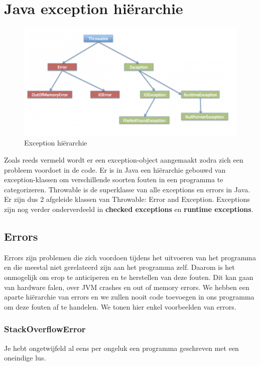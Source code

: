 \section{Java exception hi\"erarchie}
  
\begin{figure}[H]
\includegraphics[width=\linewidth]{images/h1/exception-hierarchy.png}
\caption{Exception hi\"erarchie}
\label{fig:exceptiono_hierarchy}
\end{figure}
  
Zoals reeds vermeld wordt er een exception-object aangemaakt zodra zich een probleem voordoet in de code. 
Er is in Java een hi\"erarchie gebouwd van exception-klassen om verschillende soorten fouten in een programma te categorizeren. Throwable is de superklasse van alle exceptions en errors in Java. Er zijn dus 2 afgeleide klassen van Throwable: Error and Exception. Exceptions zijn nog verder onderverdeeld in \textbf{checked exceptions} en \textbf{runtime exceptions}.

\subsection{Errors}

Errors zijn problemen die zich voordoen tijdens het uitvoeren van het programma en die meestal niet gerelateerd zijn aan het programma zelf. Daarom is het onmogelijk om erop te anticiperen en te herstellen van deze fouten. Dit kan gaan van hardware falen, over JVM crashes en out of memory errors. We hebben een aparte hi\"erarchie van errors en we zullen nooit code toevoegen in ons programma om deze fouten af te handelen. We tonen hier enkel voorbeelden van errors.


\subsubsection{StackOverflowError}
Je hebt ongetwijfeld al eens per ongeluk een programma geschreven met een oneindige lus. 

